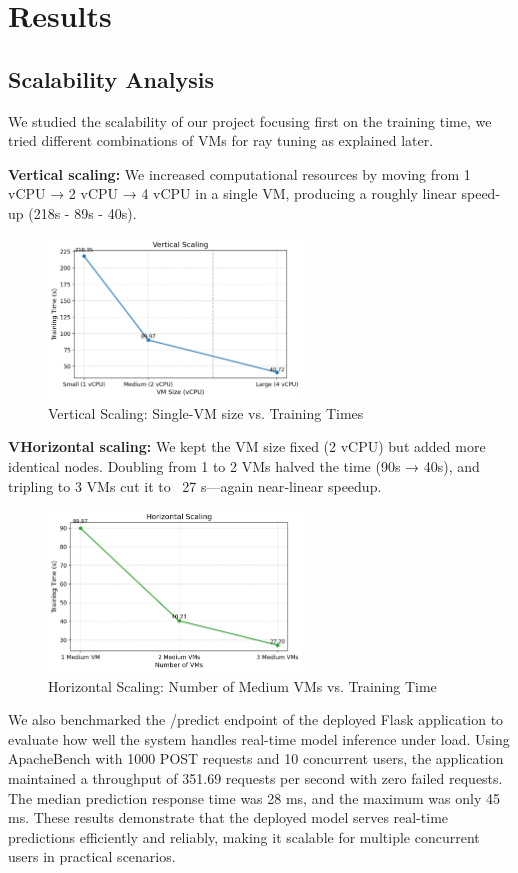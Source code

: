 \documentclass[12pt,a4paper]{article}
\begin{document}
\section{Results}
\subsection{Scalability Analysis}
We studied the scalability of our project focusing first on the training time, we tried different combinations of VMs for ray tuning as explained later.

\textbf{Vertical scaling:} We increased computational resources by moving from 1 vCPU → 2 vCPU → 4 vCPU in a single VM, producing a roughly linear speed-up (218s - 89s - 40s).
\begin{figure}[H]
  \centering
  \includegraphics[width=0.6\textwidth]{ver.png}
  \caption{Vertical Scaling: Single-VM size vs. Training Times}
  \label{fig:vertical}
\end{figure}
\textbf{VHorizontal scaling:} We kept the VM size fixed (2 vCPU) but added more identical nodes. Doubling from 1 to 2 VMs halved the time (90s → 40s), and tripling to 3 VMs cut it to ~27 s—again near‐linear speedup.
\begin{figure}[H]
  \centering
  \includegraphics[width=0.6\textwidth]{hori.png}
  \caption{Horizontal Scaling: Number of Medium VMs vs. Training Time}
  \label{fig:horizontal}
\end{figure}
We also benchmarked the /predict endpoint of the deployed Flask application to evaluate how well the system handles real-time model inference under load. Using ApacheBench with 1000 POST requests and 10 concurrent users, the application maintained a throughput of 351.69 requests per second with zero failed requests. The median prediction response time was 28 ms, and the maximum was only 45 ms. These results demonstrate that the deployed model serves real-time predictions efficiently and reliably, making it scalable for multiple concurrent users in practical scenarios.
\end{document}
